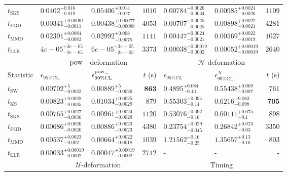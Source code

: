 \begin{tabular}{l|llr|llr}
	$t_{\mathrm{SKS}}$ & $0.0402_{-0.019}^{+0.016}$ & $0.05406_{-0.017}^{+0.014}$ & $1010$ & $0.00784_{-0.0034}^{+0.0026}$ & $0.00985_{-0.0026}^{+0.0024}$ & $1109$ \\
	$t_{\mathrm{FGD}}$ & ${\mathbf{0.00341_{-0.0011}^{+0.00091}}}$ & ${\mathbf{0.00438_{-0.00088}^{+0.00077}}}$ & $4053$ & $0.00707_{-0.0025}^{+0.0025}$ & $0.00898_{-0.0021}^{+0.0022}$ & $4281$ \\
	$t_{\mathrm{MMD}}$ & $0.02391_{-0.0083}^{+0.0084}$ & $0.02992_{-0.0075}^{+0.008}$ & $1141$ & ${\mathbf{0.00447_{-0.0021}^{+0.0024}}}$ & ${\mathbf{0.00569_{-0.0019}^{+0.0022}}}$ & $1027$ \\
	$t_{\mathrm{LLR}}$ & $4e-05_{-2e-05}^{+3e-05}$ & $6e-05_{-3e-05}^{+3e-05}$ & $3373$ & $0.00038_{-0.0002}^{+0.00019}$ & $0.00052_{-0.00019}^{+0.00019}$ & $2640$ \\
	\toprule
	\multicolumn{1}{c}{} & \multicolumn{3}{c}{$\rm{pow}_{-}$-deformation} & \multicolumn{3}{c}{$\mathcal{N}$-deformation} \\
	Statistic & $\epsilon_{95\%\mathrm{CL}}$ & $\epsilon^  {\rm{pow}_{-}}_{99\%\mathrm{CL}}$ & $t$ (s) & $\epsilon_{95\%\mathrm{CL}}$ & $\epsilon^    {\mathcal{N}}_{99\%\mathrm{CL}}$ & $t$ (s) \\
	\midrule
	$t_{\mathrm{SW}}$ & $0.00702_{-0.0032}^{+5}$ & $0.00889_{-0.0026}^{+5}$ & ${\mathbf{863}}$ & $0.4895_{-0.13}^{+0.084}$ & $0.55438_{-0.087}^{+0.069}$ & $761$ \\
	$t_{\overline{\mathrm{KS}}}$ & $0.00823_{-0.0035}^{+0.0028}$ & $0.01034_{-0.0029}^{+0.0025}$ & $879$ & $0.55303_{-0.14}^{+0.094}$ & $0.6216_{-0.098}^{+0.083}$ & ${\mathbf{705}}$ \\
	$t_{\mathrm{SKS}}$ & $0.00765_{-0.0036}^{+0.0027}$ & $0.00961_{-0.0028}^{+0.0024}$ & $1120$ & $0.53076_{-0.16}^{+0.092}$ & $0.60111_{-0.1}^{+0.075}$ & $898$ \\
	$t_{\mathrm{FGD}}$ & $0.00686_{-0.0026}^{+0.0026}$ & $0.00886_{-0.0023}^{+0.0023}$ & $4380$ & ${\mathbf{0.23754_{-0.045}^{+0.029}}}$ & ${\mathbf{0.26842_{-0.03}^{+0.023}}}$ & $3350$ \\
	$t_{\mathrm{MMD}}$ & ${\mathbf{0.00537_{-0.002}^{+0.0023}}}$ & ${\mathbf{0.00664_{-0.0018}^{+0.0022}}}$ & $1039$ & $1.21562_{-0.25}^{+0.16}$ & $1.35657_{-0.16}^{+0.13}$ & $803$ \\
	$t_{\mathrm{LLR}}$ & $0.00033_{-0.0002}^{+0.00019}$ & $0.00047_{-0.0002}^{+0.00019}$ & $2712$ & - & - & - \\
	\toprule
	\multicolumn{1}{c}{} & \multicolumn{3}{c}{$\mathcal{U}$-deformation} & \multicolumn{3}{c}{Timing} \\

\end{tabular}
